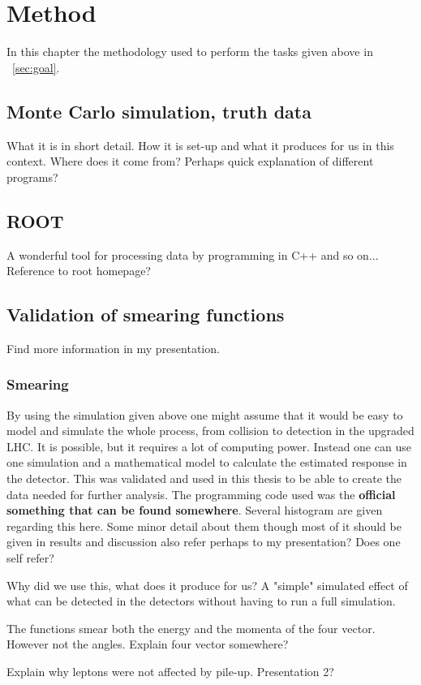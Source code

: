 \chapter{Method}\label{cha:meth}
In this chapter the methodology used to perform the tasks given above in ~\ref{sec:goal}.
\newpage
\section{Monte Carlo simulation, truth data}
What it is in short detail. How it is set-up and what it produces for us in this context. 
Where does it come from? Perhaps quick explanation of different programs?
\section{ROOT}
A wonderful tool for processing data by programming in C++ and so on... Reference to root homepage?
\section{Validation of smearing functions}
Find more information in my presentation.
\subsection{Smearing}
By using the simulation given above one might assume that it would be easy to model and simulate the whole process, from collision to detection in the upgraded LHC. It is possible, but it requires a lot of computing power. Instead one can use one simulation and a mathematical model to calculate the estimated response in the detector. This was validated and used in this thesis to be able to create the data needed for further analysis. The programming code used was the \textbf{official something that can be found somewhere}. 
Several histogram are given regarding this here. Some minor detail about them though most of it should be given in results and discussion also refer perhaps to my presentation? Does one self refer?


Why did we use this, what does it produce for us? A "simple" simulated effect of what can be detected in the detectors without having to run a full simulation. 

The functions smear both the energy and the momenta of the four vector. However not the angles. Explain four vector somewhere?

Explain why leptons were not affected by pile-up. Presentation 2?

